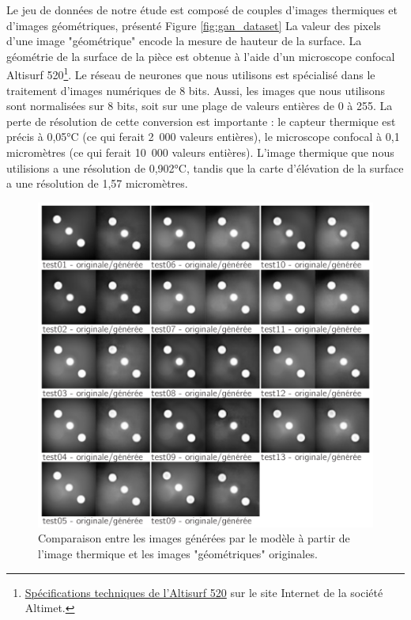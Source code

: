 Le jeu de données de notre étude est composé de couples d'images thermiques et d'images géométriques, présenté Figure \ref{fig:gan_dataset}
La valeur des pixels d'une image "géométrique" encode la mesure de hauteur de la surface.
La géométrie de la surface de la pièce est obtenue à l'aide d'un microscope confocal Altisurf 520\footnote{\href{https://www.altimet.fr/?page_id=236}{Spécifications techniques de l'Altisurf 520} sur le site Internet de la société Altimet.}.
Le réseau de neurones que nous utilisons est spécialisé dans le traitement d'images numériques de 8 bits.
Aussi, les images que nous utilisons sont normalisées sur 8 bits, soit sur une plage de valeurs entières de 0 à 255.
La perte de résolution de cette conversion est importante : le capteur thermique est précis à 0,05°C (ce qui ferait 2 000 valeurs entières), le microscope confocal à 0,1 micromètres (ce qui ferait 10 000 valeurs entières).
L'image thermique que nous utilisions a une résolution de 0,902°C, tandis que la carte d'élévation de la surface a une résolution de 1,57 micromètres.

\begin{figure}[tbph]
	\centering
	\includegraphics[width=\textwidth]{../Chap2/Figures/sapristi_GAN_thermo_geo_testSet.pdf}
	\caption{Comparaison entre les images générées par le modèle à partir de l'image thermique et les images "géométriques" originales.}
	\label{fig:gan_results}
\end{figure}

